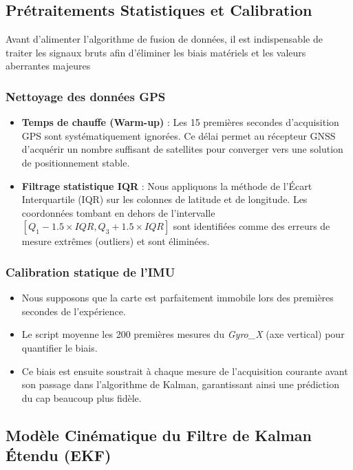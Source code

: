 \subsection{Prétraitements Statistiques et Calibration}

Avant d'alimenter l'algorithme de fusion de données, il est indispensable de traiter les signaux bruts afin d'éliminer les biais matériels et les valeurs aberrantes majeures

\subsubsection{Nettoyage des données GPS}
\begin{itemize}
    \item[$\bullet$] \textbf{Temps de chauffe (Warm-up)} : Les 15 premières secondes d'acquisition GPS sont systématiquement ignorées. Ce délai permet au récepteur GNSS d'acquérir un nombre suffisant de satellites pour converger vers une solution de positionnement stable.
    \item[$\bullet$] \textbf{Filtrage statistique IQR} : Nous appliquons la méthode de l'Écart Interquartile (IQR) sur les colonnes de latitude et de longitude. Les coordonnées tombant en dehors de l'intervalle $[Q_1 - 1.5 \times IQR, Q_3 + 1.5 \times IQR]$ sont identifiées comme des erreurs de mesure extrêmes (outliers) et sont éliminées.
\end{itemize}

\subsubsection{Calibration statique de l'IMU}

\begin{itemize}
    \item[$\bullet$] Nous supposons que la carte est parfaitement immobile lors des premières secondes de l'expérience.
    \item[$\bullet$] Le script moyenne les 200 premières mesures du \textit{Gyro\_X} (axe vertical) pour quantifier le biais.
    \item[$\bullet$] Ce biais est ensuite soustrait à chaque mesure de l'acquisition courante avant son passage dans l'algorithme de Kalman, garantissant ainsi une prédiction du cap beaucoup plus fidèle.
\end{itemize}

\subsection{Modèle Cinématique du Filtre de Kalman Étendu (EKF)}

